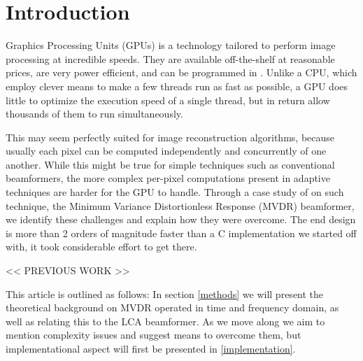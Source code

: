 \documentclass[
a4paper,10pt
]{ica2013_2}
\newcommand\1{\vec 1}
\begin{document}


\section{Introduction}

Graphics Processing Units (GPUs) is a technology tailored to perform image processing at incredible speeds. They are available off-the-shelf at reasonable prices, are very power efficient, and can be programmed in . Unlike a CPU, which employ clever means to make a few threads run as fast as possible, a GPU does little to optimize the execution speed of a single thread, but in return allow thousands of them to run simultaneously.

This may seem perfectly suited for image reconstruction algorithms, because usually each pixel can be computed independently and concurrently of one another. While this might be true for simple techniques such as conventional beamformers, the more complex per-pixel computations present in adaptive techniques are harder for the GPU to handle. Through a case study of on such technique, the Minimum Variance Distortionless Response (MVDR) beamformer, we identify these challenges and explain how they were overcome. The end design is more than 2 orders of magnitude faster than a C implementation we started off with, it took considerable effort to get there.

<< PREVIOUS WORK >>

This article is outlined as follows: In section \ref{methods} we will present the theoretical background on MVDR operated in time and frequency domain, as well as relating this to the LCA beamformer.  As we move along we aim to mention complexity issues and suggest means to overcome them, but implementational aspect will first be presented in \ref{implementation}.

% 

\end{document}
